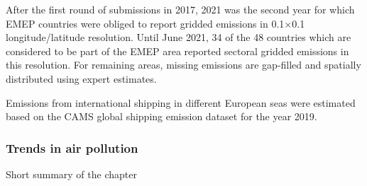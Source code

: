 After the first round of submissions in 2017, 2021 was the second year for which EMEP countries were obliged to report gridded emissions in  0.1{\degrees}$\times$0.1{\degrees} lon\-gi\-tude/la\-ti\-tude resolution. Until June 2021, 34 of the 48 countries which are considered to be part of the EMEP area reported sectoral gridded emissions in this resolution. For remaining areas, missing emissions are gap-filled and spatially distributed using expert estimates.

Emissions from international shipping in different European seas were estimated based on the CAMS global shipping emission dataset for the year 2019.

\subsubsection*{Trends in air pollution}
Short summary of the chapter


